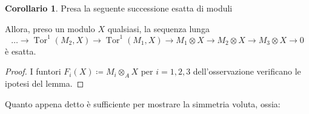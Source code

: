 \documentclass[a4paper,11pt,oneside]{book}
\DeclareMathOperator{\Tor}{Tor}
\theoremstyle{definition}
\newtheorem{cor}{Corollario}
\begin{document}
  \begin{cor}
  Presa la seguente successione esatta di moduli
  \begin{center}
      \end{center} 
      Allora, preso un modulo $X$ qualsiasi, la sequenza lunga
      \[
	\dots \rightarrow \Tor^1(M_2,X)\rightarrow  \Tor^1(M_1,X) \rightarrow  M_1\otimes X  \rightarrow  M_2\otimes X \rightarrow M_3\otimes X \rightarrow 0
      \]
      \`e esatta.
  \end{cor}\label{cor:esattainlunga}
  \begin{proof}
  I funtori $F_i(X)\coloneqq M_i\otimes_A X$ per $i=1,2,3$ dell'osservazione verificano le ipotesi del lemma.
  \end{proof}
  
  Quanto appena detto \`e sufficiente per mostrare la simmetria voluta, ossia: 
  
\end{document}
